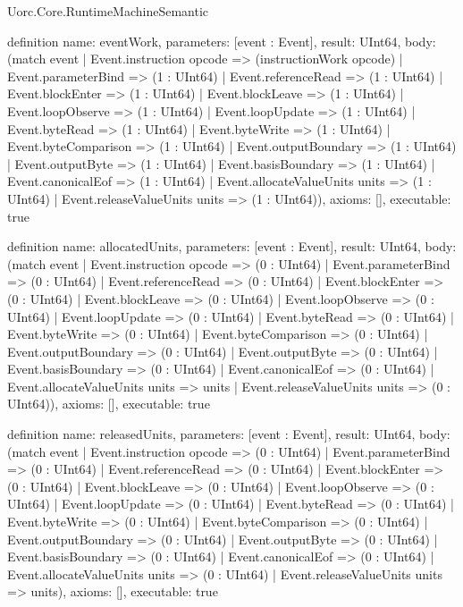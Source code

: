 \begin{lexlean}{Uorc.Core.RuntimeMachineSemantic}
\begin{semanticmodule}
definition{
  name: eventWork,
  parameters: [event : Event],
  result: UInt64,
  body: (match event
    | Event.instruction opcode => (instructionWork opcode)
    | Event.parameterBind => (1 : UInt64)
    | Event.referenceRead => (1 : UInt64)
    | Event.blockEnter => (1 : UInt64)
    | Event.blockLeave => (1 : UInt64)
    | Event.loopObserve => (1 : UInt64)
    | Event.loopUpdate => (1 : UInt64)
    | Event.byteRead => (1 : UInt64)
    | Event.byteWrite => (1 : UInt64)
    | Event.byteComparison => (1 : UInt64)
    | Event.outputBoundary => (1 : UInt64)
    | Event.outputByte => (1 : UInt64)
    | Event.basisBoundary => (1 : UInt64)
    | Event.canonicalEof => (1 : UInt64)
    | Event.allocateValueUnits units => (1 : UInt64)
    | Event.releaseValueUnits units => (1 : UInt64)),
  axioms: [],
  executable: true
}

definition{
  name: allocatedUnits,
  parameters: [event : Event],
  result: UInt64,
  body: (match event
    | Event.instruction opcode => (0 : UInt64)
    | Event.parameterBind => (0 : UInt64)
    | Event.referenceRead => (0 : UInt64)
    | Event.blockEnter => (0 : UInt64)
    | Event.blockLeave => (0 : UInt64)
    | Event.loopObserve => (0 : UInt64)
    | Event.loopUpdate => (0 : UInt64)
    | Event.byteRead => (0 : UInt64)
    | Event.byteWrite => (0 : UInt64)
    | Event.byteComparison => (0 : UInt64)
    | Event.outputBoundary => (0 : UInt64)
    | Event.outputByte => (0 : UInt64)
    | Event.basisBoundary => (0 : UInt64)
    | Event.canonicalEof => (0 : UInt64)
    | Event.allocateValueUnits units => units
    | Event.releaseValueUnits units => (0 : UInt64)),
  axioms: [],
  executable: true
}

definition{
  name: releasedUnits,
  parameters: [event : Event],
  result: UInt64,
  body: (match event
    | Event.instruction opcode => (0 : UInt64)
    | Event.parameterBind => (0 : UInt64)
    | Event.referenceRead => (0 : UInt64)
    | Event.blockEnter => (0 : UInt64)
    | Event.blockLeave => (0 : UInt64)
    | Event.loopObserve => (0 : UInt64)
    | Event.loopUpdate => (0 : UInt64)
    | Event.byteRead => (0 : UInt64)
    | Event.byteWrite => (0 : UInt64)
    | Event.byteComparison => (0 : UInt64)
    | Event.outputBoundary => (0 : UInt64)
    | Event.outputByte => (0 : UInt64)
    | Event.basisBoundary => (0 : UInt64)
    | Event.canonicalEof => (0 : UInt64)
    | Event.allocateValueUnits units => (0 : UInt64)
    | Event.releaseValueUnits units => units),
  axioms: [],
  executable: true
}


\end{semanticmodule}
\end{lexlean}
